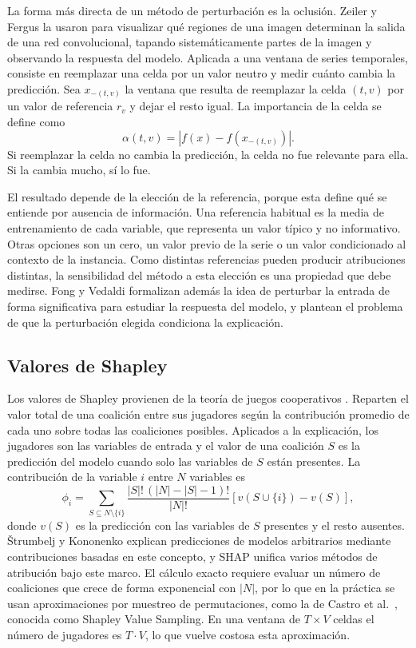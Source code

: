 La forma más directa de un método de perturbación es la oclusión. Zeiler y Fergus \cite{zeiler2014} la usaron para visualizar qué regiones de una imagen determinan la salida de una red convolucional, tapando sistemáticamente partes de la imagen y observando la respuesta del modelo. Aplicada a una ventana de series temporales, consiste en reemplazar una celda por un valor neutro y medir cuánto cambia la predicción. Sea $x_{-(t,v)}$ la ventana que resulta de reemplazar la celda $(t,v)$ por un valor de referencia $r_{v}$ y dejar el resto igual. La importancia de la celda se define como
\begin{equation}
    \alpha(t,v) = \left| f(x) - f(x_{-(t,v)}) \right|.
    \label{eq:oclusion}
\end{equation}
Si reemplazar la celda no cambia la predicción, la celda no fue relevante para ella. Si la cambia mucho, sí lo fue.

El resultado depende de la elección de la referencia, porque esta define qué se entiende por ausencia de información. Una referencia habitual es la media de entrenamiento de cada variable, que representa un valor típico y no informativo. Otras opciones son un cero, un valor previo de la serie o un valor condicionado al contexto de la instancia. Como distintas referencias pueden producir atribuciones distintas, la sensibilidad del método a esta elección es una propiedad que debe medirse. Fong y Vedaldi \cite{fong2017} formalizan además la idea de perturbar la entrada de forma significativa para estudiar la respuesta del modelo, y plantean el problema de que la perturbación elegida condiciona la explicación.

\subsection{Valores de Shapley}
\label{sec:mt_shapley}

Los valores de Shapley provienen de la teoría de juegos cooperativos \cite{shapley1953}. Reparten el valor total de una coalición entre sus jugadores según la contribución promedio de cada uno sobre todas las coaliciones posibles. Aplicados a la explicación, los jugadores son las variables de entrada y el valor de una coalición $S$ es la predicción del modelo cuando solo las variables de $S$ están presentes. La contribución de la variable $i$ entre $N$ variables es
\begin{equation}
    \phi_i = \sum_{S \subseteq N \setminus \{i\}} \frac{|S|!\,(|N|-|S|-1)!}{|N|!} \left[ v(S \cup \{i\}) - v(S) \right],
\end{equation}
donde $v(S)$ es la predicción con las variables de $S$ presentes y el resto ausentes. Štrumbelj y Kononenko \cite{strumbelj2014} explican predicciones de modelos arbitrarios mediante contribuciones basadas en este concepto, y SHAP \cite{lundberg2017} unifica varios métodos de atribución bajo este marco. El cálculo exacto requiere evaluar un número de coaliciones que crece de forma exponencial con $|N|$, por lo que en la práctica se usan aproximaciones por muestreo de permutaciones, como la de Castro et al.\ \cite{castro2009}, conocida como Shapley Value Sampling. En una ventana de $T \times V$ celdas el número de jugadores es $T \cdot V$, lo que vuelve costosa esta aproximación.

